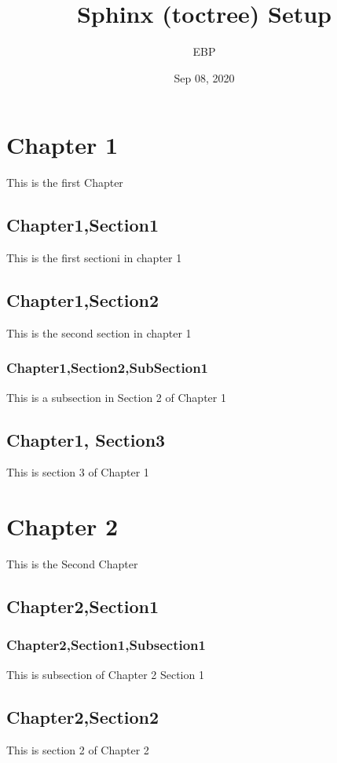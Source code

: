 \documentclass[letterpaper,10pt,english]{sphinxmanual}
\title{Sphinx (toctree) Setup}
\date{Sep 08, 2020}
\author{EBP}
\begin{document}
\pagestyle{empty}
\sphinxmaketitle
\pagestyle{plain}
\sphinxtableofcontents
\pagestyle{normal}
\label{\detokenize{index::doc}}



\chapter{Chapter 1}
\label{\detokenize{chapter1:chapter-1}}\label{\detokenize{chapter1::doc}}
This is the first Chapter


\section{Chapter1,Section1}
\label{\detokenize{chapter1:chapter1-section1}}
This is the first sectioni in chapter 1


\section{Chapter1,Section2}
\label{\detokenize{chapter1:chapter1-section2}}
This is the second section in chapter 1


\subsection{Chapter1,Section2,SubSection1}
\label{\detokenize{chapter1:chapter1-section2-subsection1}}
This is a subsection in Section 2 of Chapter 1


\section{Chapter1, Section3}
\label{\detokenize{chapter1:chapter1-section3}}
This is section 3 of Chapter 1


\chapter{Chapter 2}
\label{\detokenize{chapter2:chapter-2}}\label{\detokenize{chapter2::doc}}
This is the Second Chapter


\section{Chapter2,Section1}
\label{\detokenize{chapter2:chapter2-section1}}

\subsection{Chapter2,Section1,Subsection1}
\label{\detokenize{chapter2:chapter2-section1-subsection1}}
This is subsection of Chapter 2 Section 1


\section{Chapter2,Section2}
\label{\detokenize{chapter2:chapter2-section2}}
This is section 2 of Chapter 2







\renewcommand{\indexname}{Index}
\printindex
\end{document}

